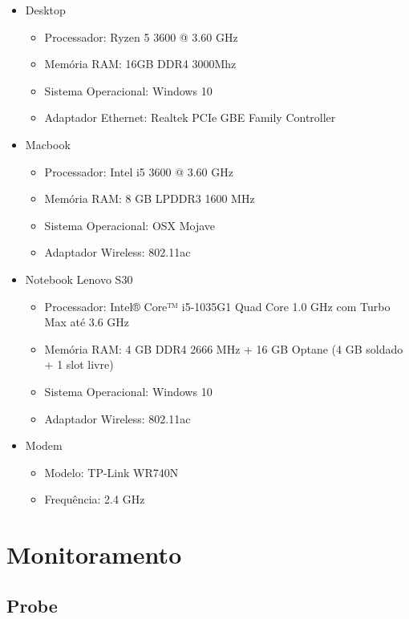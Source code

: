 \documentclass[12pt]{article}
\begin{document}
\begin{itemize}
    \item Desktop
    \begin{itemize}
        \item Processador: Ryzen 5 3600 @ 3.60 GHz
        \item Memória RAM: 16GB DDR4 3000Mhz
        \item Sistema Operacional: Windows 10
        \item Adaptador Ethernet: Realtek PCIe GBE Family Controller
    \end{itemize}
    \item Macbook
    \begin{itemize}
        \item Processador: Intel i5 3600 @ 3.60 GHz
        \item Memória RAM: 8 GB LPDDR3 1600 MHz
        \item Sistema Operacional: OSX Mojave
        \item Adaptador Wireless: 802.11ac
    \end{itemize}
    \item Notebook Lenovo S30
    \begin{itemize}
        \item Processador: Intel® Core™ i5-1035G1 Quad Core 1.0 GHz com Turbo Max até 3.6 GHz
        \item Memória RAM: 4 GB DDR4 2666 MHz + 16 GB Optane (4 GB soldado + 1 slot livre)
        \item Sistema Operacional: Windows 10
        \item Adaptador Wireless: 802.11ac
    \end{itemize}
    \item Modem
    \begin{itemize}
        \item Modelo: TP-Link WR740N
        \item Frequência: 2.4 GHz
    \end{itemize}
\end{itemize}

\section{Monitoramento}

\subsection{Probe}
\end{document}
